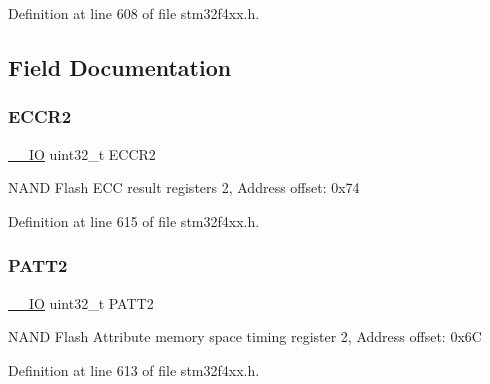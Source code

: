 Definition at line 608 of file stm32f4xx.\+h.



\subsection{Field Documentation}
\mbox{\label{struct_f_s_m_c___bank2___type_def_a05a47a1664adc7a3db3fa3e83fe883b4}} 
\subsubsection{\texorpdfstring{E\+C\+C\+R2}{ECCR2}}
{\footnotesize\ttfamily \hyperlink{group___c_m_s_i_s__core__definitions_gaec43007d9998a0a0e01faede4133d6be}{\+\_\+\+\_\+\+IO} uint32\+\_\+t E\+C\+C\+R2}

N\+A\+ND Flash E\+CC result registers 2, Address offset\+: 0x74 

Definition at line 615 of file stm32f4xx.\+h.

\mbox{\label{struct_f_s_m_c___bank2___type_def_a9c1bc909ec5ed32df45444488ea6668b}} 
\subsubsection{\texorpdfstring{P\+A\+T\+T2}{PATT2}}
{\footnotesize\ttfamily \hyperlink{group___c_m_s_i_s__core__definitions_gaec43007d9998a0a0e01faede4133d6be}{\+\_\+\+\_\+\+IO} uint32\+\_\+t P\+A\+T\+T2}

N\+A\+ND Flash Attribute memory space timing register 2, Address offset\+: 0x6C 

Definition at line 613 of file stm32f4xx.\+h.

\mbox{\label{struct_f_s_m_c___bank2___type_def_ab0cb1d704ee64c62ad5be55522a2683a}} 

